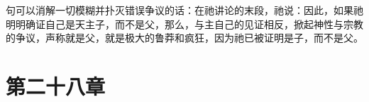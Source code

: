 句可以消解一切模糊并扑灭错误争议的话：在祂讲论的末段，祂说：因此，如果祂明明确证自己是天主子，而不是父，那么，与主自己的见证相反，掀起神性与宗教的争议，声称就是父，就是极大的鲁莽和疯狂，因为祂已被证明是子，而不是父。\par


\section{第二十八章}

\par

